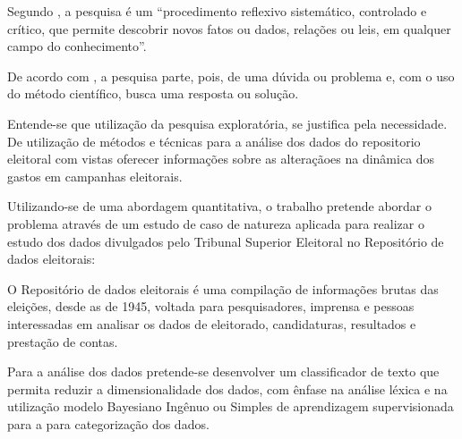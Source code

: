 \documentclass[
	12pt,				%
	openright,			%
	oneside,			%
	a4paper,			%
	english,			%
	french,				%
	spanish,			%
	brazil,				%
	]{abntex2}
\begin{document}
Segundo , a pesquisa é um “procedimento reflexivo sistemático, controlado e crítico, que permite descobrir novos fatos ou dados, relações ou leis, em qualquer campo do conhecimento”.

De acordo com , a pesquisa parte, pois, de uma dúvida ou problema e, com o uso do método científico, busca uma resposta ou solução.

Entende-se que utilização da pesquisa exploratória, se justifica pela necessidade. De utilização de métodos e técnicas para a análise dos dados do repositorio eleitoral com vistas oferecer informações sobre as alteraçãoes na dinâmica dos gastos em campanhas eleitorais. \cite{cervo2007roberto}

Utilizando-se de uma abordagem quantitativa, o trabalho pretende abordar o problema através de um estudo de caso de natureza aplicada para realizar o estudo dos dados divulgados pelo Tribunal Superior Eleitoral no Repositório de dados eleitorais:

\begin{citacao}
 O Repositório de dados eleitorais é uma compilação de informações brutas das eleições, desde as de 1945, voltada para pesquisadores, imprensa e pessoas interessadas em analisar os dados de eleitorado, candidaturas, resultados e prestação de contas. \cite{brasil2017repositorio}
\end{citacao}

Para a análise dos dados pretende-se desenvolver um classificador de texto que permita reduzir a dimensionalidade dos dados, com ênfase na análise léxica e na utilização modelo Bayesiano Ingênuo ou Simples de aprendizagem supervisionada para a para categorização dos dados.


\postextual




\end{document}
